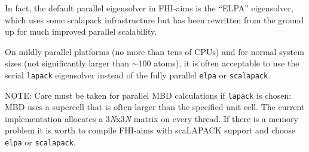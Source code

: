 In fact, the default parallel eigensolver in FHI-aims is the ``ELPA''
eigensolver, which uses some scalapack infrastructure but has been
rewritten from the ground up for much improved parallel scalability.

On mildly parallel platforms (no more than tens
of CPUs) and for normal system sizes (not significantly larger than
$\sim$100 atoms), it is often acceptable to use the serial
\texttt{lapack} eigensolver instead of the fully parallel
\texttt{elpa} or \texttt{scalapack}.

NOTE: Care must be taken for parallel MBD calculations if \texttt{lapack} is chosen: MBD uses a supercell that is often larger than the specified unit cell. The current implementation allocates a 3{\it N}x3{\it N} matrix on every thread. If there is a memory problem it is worth to compile FHI-aims with scaLAPACK support and choose \texttt{elpa} or \texttt{scalapack}.
